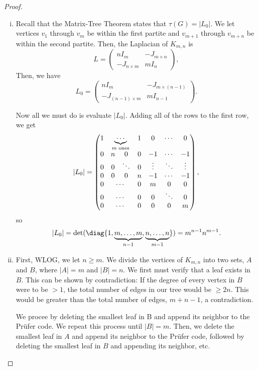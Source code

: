 \documentclass[11pt]{article}
\begin{document}
\begin{proof}
    \begin{enumerate}[(i)]
        \item Recall that the Matrix-Tree Theorem states that $\tau(G) = |L_0|$. We let vertices $v_1$ through $v_m$ be within the first partite and $v_{m+1}$ through $v_{m+n}$ be within the second partite. Then, the Laplacian of $K_{m,n}$ is \[L=\begin{pmatrix}nI_m&-J_{m \times n}\\-J_{n \times m}&mI_n\end{pmatrix},\] Then, we have
        \[
            L_0=\begin{pmatrix}nI_m&-J_{m \times (n-1)}\\-J_{(n-1) \times m}&mI_{n-1}\end{pmatrix}.
        \]

        Now all we must do is evaluate $|L_0|$. Adding all of the rows to the first row, we get
        \[
            |L_0| = \begin{pmatrix}
                1 & \multicolumn{2}{c}{\underbrace{\cdots}_{m\text{ ones}}} & 1 & 0 & \cdots & 0\\
                0 & n & 0 & 0 & -1 & \cdots & -1\\
                0 & 0 & \ddots & 0 & \vdots & \ddots & \vdots\\
                0 & 0 & 0 & n & -1 & \cdots & -1\\
                0 & \multicolumn{2}{c}{\cdots} & 0 & m & 0 & 0\\
                0 & \multicolumn{2}{c}{\cdots} & 0 & 0 & \ddots & 0\\
                0 & \multicolumn{2}{c}{\cdots} & 0 & 0 & 0 & m

            \end{pmatrix},
        \]
            so \[|L_0|=\det(\diag\{1,\underbrace{m,\dots,m}_{n-1},\underbrace{n,\dots,n}_{m-1}\})=m^{n-1}n^{m-1}.\]
        \item First, WLOG, we let $n \ge m$. We divide the vertices of $K_{m,n}$ into two sets, $A$ and $B$, where $|A|=m$ and $|B|=n$. We first must verify that a leaf exists in $B$. This can be shown by contradiction: If the degree of every vertex in $B$ were to be $> 1$, the total number of edges in our tree would be $\ge 2n$. This would be greater than the total number of edges, $m + n - 1$, a contradiction.
        
        We procee by deleting the smallest leaf in B and append its neighbor to the Prüfer code. We repeat this process until $|B|=m$. Then, we delete the smallest leaf in $A$ and append its neighbor to the Prüfer code, followed by deleting the smallest leaf in $B$ and appending its neighbor, etc.
        

\end{enumerate}
\end{proof}
\end{document}
